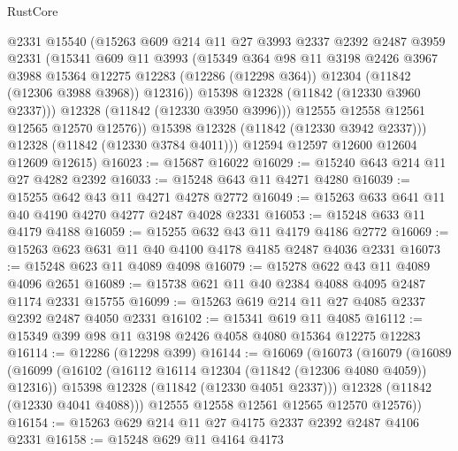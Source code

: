\begin{lexlean}{RustCore}
\begin{coremodule}
                @2331
                @15540
                (@15263
                  @609
                  @214
                  @11
                  @27
                  @3993
                  @2337
                  @2392
                  @2487
                  @3959
                  @2331
                  (@15341
                    @609
                    @11
                    @3993
                    (@15349
                      @364
                      @98
                      @11
                      @3198
                      @2426
                      @3967
                      @3988
                      @15364
                      @12275
                      @12283
                      (@12286 (@12298 @364))
                      @12304
                      (@11842 (@12306 @3988 @3968))
                      @12316))
                  @15398
                  @12328
                  (@11842 (@12330 @3960 @2337)))
                @12328
                (@11842 (@12330 @3950 @3996)))
              @12555
              @12558
              @12561
              @12565
              @12570
              @12576))
          @15398
          @12328
          (@11842 (@12330 @3942 @2337)))
        @12328
        (@11842 (@12330 @3784 @4011)))
      @12594
      @12597
      @12600
      @12604
      @12609
      @12615)
@16023 := @15687 @16022
@16029 := @15240 @643 @214 @11 @27 @4282 @2392
@16033 := @15248 @643 @11 @4271 @4280
@16039 := @15255 @642 @43 @11 @4271 @4278 @2772
@16049 := @15263 @633 @641 @11 @40 @4190 @4270 @4277 @2487 @4028 @2331
@16053 := @15248 @633 @11 @4179 @4188
@16059 := @15255 @632 @43 @11 @4179 @4186 @2772
@16069 := @15263 @623 @631 @11 @40 @4100 @4178 @4185 @2487 @4036 @2331
@16073 := @15248 @623 @11 @4089 @4098
@16079 := @15278 @622 @43 @11 @4089 @4096 @2651
@16089 := @15738 @621 @11 @40 @2384 @4088 @4095 @2487 @1174 @2331 @15755
@16099 := @15263 @619 @214 @11 @27 @4085 @2337 @2392 @2487 @4050 @2331
@16102 := @15341 @619 @11 @4085
@16112 := @15349 @399 @98 @11 @3198 @2426 @4058 @4080 @15364 @12275 @12283
@16114 := @12286 (@12298 @399)
@16144 := @16069
    (@16073
      (@16079
        (@16089
          (@16099
            (@16102 (@16112 @16114 @12304 (@11842 (@12306 @4080 @4059)) @12316))
            @15398
            @12328
            (@11842 (@12330 @4051 @2337)))
          @12328
          (@11842 (@12330 @4041 @4088)))
        @12555
        @12558
        @12561
        @12565
        @12570
        @12576))
@16154 := @15263 @629 @214 @11 @27 @4175 @2337 @2392 @2487 @4106 @2331
@16158 := @15248 @629 @11 @4164 @4173

\end{coremodule}
\end{lexlean}
